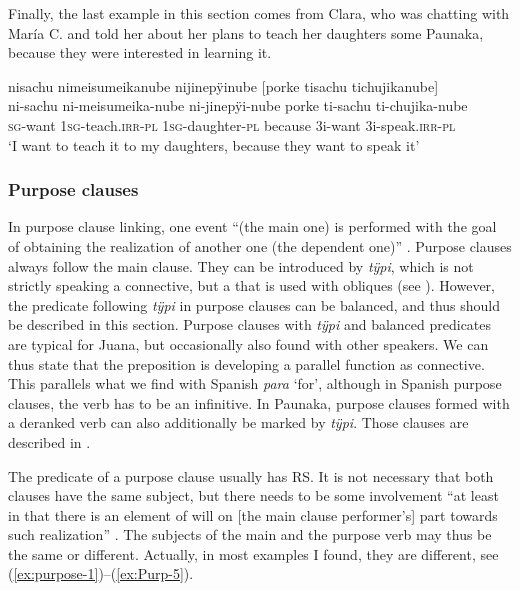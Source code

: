 
Finally, the last example in this section comes from Clara, who was chatting with María C. and told her about her plans to teach her daughters some Paunaka, because they were interested in learning it.

\ea\label{ex:porque-3}
\begingl
\glpreamble nisachu nimeisumeikanube nijinepÿinube \textup{[}porke tisachu tichujikanube\textup{]}\\
\gla ni-sachu ni-meisumeika-nube ni-jinepÿi-nube porke ti-sachu ti-chujika-nube\\
\textsc{sg}-want 1\textsc{sg}-teach.\textsc{irr}-\textsc{pl} 1\textsc{sg}-daughter-\textsc{pl} because 3i-want 3i-speak.\textsc{irr}-\textsc{pl}\\
\glft ‘I want to teach it to my daughters, because they want to speak it’
\endgl
\trailingcitation{[cux-c120414ls-2.323-324]}
\xe
{}

\subsubsection{Purpose clauses}\label{sec:PurposeClauses}

In purpose clause linking, one event “(the main one) is performed with the goal of obtaining the realization of another one (the dependent one)” \citep[157]{Cristofaro2003}. Purpose clauses always follow the main clause. They can be introduced by \textit{tÿpi}, which is not strictly speaking a connective, but a  that is used with obliques (see ). However, the predicate following \textit{tÿpi} in purpose clauses can be balanced, and thus should be described in this section. Purpose clauses with \textit{tÿpi} and balanced predicates are typical for Juana, but occasionally also found with other speakers. We can thus state that the preposition is developing a parallel function as connective. This parallels what we find with Spanish \textit{para} ‘for’, although in Spanish purpose clauses, the verb has to be an infinitive. In Paunaka, purpose clauses formed with a deranked verb can also additionally be marked by \textit{tÿpi}. Those clauses are described in .

The predicate of a purpose clause usually has  RS. It is not necessary that both clauses have the same subject, but there needs to be some involvement “at least in that there is an element of will on [the main clause performer’s] part towards such realization” \citep[157]{Cristofaro2003}. The subjects of the main and the purpose verb may thus be the same or different. Actually, in most examples I found, they are different, see (\ref{ex:purpose-1})–(\ref{ex:Purp-5}).

